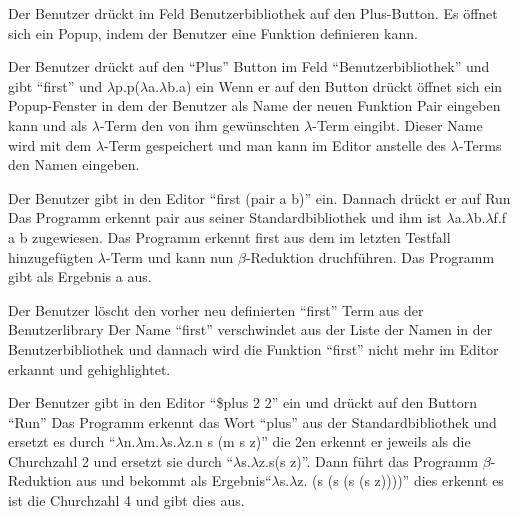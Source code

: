 \documentclass[parskip=full,11pt,twoside]{scrartcl}
\begin{document}

{Der Benutzer drückt im Feld Benutzerbibliothek auf den Plus-Button.}
{Es öffnet sich ein Popup, indem der Benutzer eine Funktion definieren kann.}

{Der Benutzer drückt auf den \enquote{Plus} Button im Feld \enquote{Benutzerbibliothek} und gibt \enquote {first} und $\lambda$p.p($\lambda$a.$\lambda$b.a) ein}
{Wenn er auf den Button drückt öffnet sich ein Popup-Fenster in dem der Benutzer als Name der neuen Funktion Pair eingeben kann und als $\lambda$-Term den von ihm gewünschten $\lambda$-Term eingibt. Dieser Name wird mit dem $\lambda$-Term gespeichert und man kann im Editor anstelle des $\lambda$-Terms den Namen eingeben.}

{ Der Benutzer gibt in den Editor \enquote {first (pair a b)} ein. Dannach drückt er auf Run}
{ Das Programm erkennt pair aus seiner Standardbibliothek und ihm ist $\lambda$a.$\lambda$b.$\lambda$f.f a b  zugewiesen. Das Programm erkennt first aus dem im letzten Testfall hinzugefügten $\lambda$-Term und kann nun $\beta$-Reduktion druchführen. Das Programm gibt als Ergebnis a aus.}

{Der Benutzer löscht den vorher neu definierten \enquote{first} Term aus der Benutzerlibrary}
{Der Name \enquote{first} verschwindet aus der Liste der Namen in der Benutzerbibliothek und dannach wird die Funktion \enquote{first} nicht mehr im Editor erkannt und gehighlightet.}

{Der Benutzer gibt in den Editor \enquote {\$plus 2 2} ein und drückt auf den Buttorn \enquote {Run}}
{ Das Programm erkennt das Wort \enquote {plus} aus der Standardbibliothek und ersetzt es durch \enquote {$\lambda$n.$\lambda$m.$\lambda$s.$\lambda$z.n s (m s z)} die 2en erkennt er jeweils als die Churchzahl 2 und ersetzt sie durch \enquote {$\lambda$s.$\lambda$z.s(s z)}. Dann führt das Programm $\beta$-Reduktion aus und bekommt als Ergebnis\enquote {$\lambda$s.$\lambda$z. (s (s (s (s z))))} dies erkennt es ist die Churchzahl 4 und gibt dies aus. }
\end{document}
